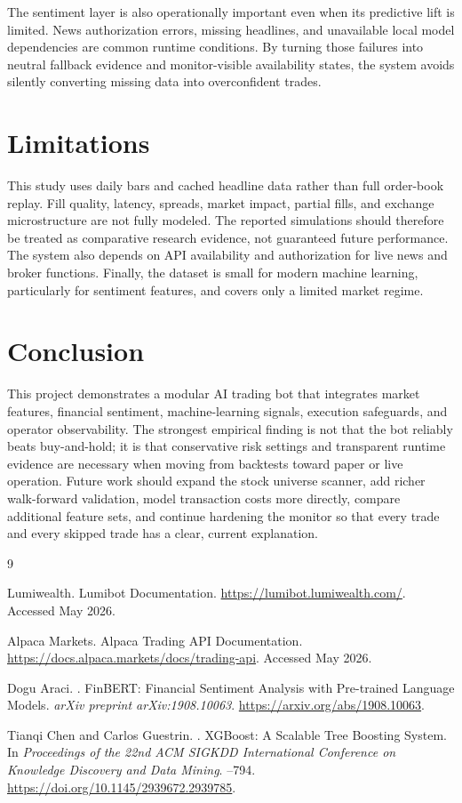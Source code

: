 \documentclass[sigconf,nonacm]{acmart}
\begin{document}
The sentiment layer is also operationally important even when its predictive lift is limited. News authorization errors, missing headlines, and unavailable local model dependencies are common runtime conditions. By turning those failures into neutral fallback evidence and monitor-visible availability states, the system avoids silently converting missing data into overconfident trades.

\section{Limitations}
This study uses daily bars and cached headline data rather than full order-book replay. Fill quality, latency, spreads, market impact, partial fills, and exchange microstructure are not fully modeled. The reported simulations should therefore be treated as comparative research evidence, not guaranteed future performance. The system also depends on API availability and authorization for live news and broker functions. Finally, the dataset is small for modern machine learning, particularly for sentiment features, and covers only a limited market regime.

\section{Conclusion}
This project demonstrates a modular AI trading bot that integrates market features, financial sentiment, machine-learning signals, execution safeguards, and operator observability. The strongest empirical finding is not that the bot reliably beats buy-and-hold; it is that conservative risk settings and transparent runtime evidence are necessary when moving from backtests toward paper or live operation. Future work should expand the stock universe scanner, add richer walk-forward validation, model transaction costs more directly, compare additional feature sets, and continue hardening the monitor so that every trade and every skipped trade has a clear, current explanation.

\begin{thebibliography}{9}

Lumiwealth.
\newblock Lumibot Documentation.
\newblock \url{https://lumibot.lumiwealth.com/}.
\newblock Accessed May 2026.

Alpaca Markets.
\newblock Alpaca Trading API Documentation.
\newblock \url{https://docs.alpaca.markets/docs/trading-api}.
\newblock Accessed May 2026.

Dogu Araci.
.
\newblock FinBERT: Financial Sentiment Analysis with Pre-trained Language Models.
\newblock \emph{arXiv preprint arXiv:1908.10063}.
\newblock \url{https://arxiv.org/abs/1908.10063}.

Tianqi Chen and Carlos Guestrin.
.
\newblock XGBoost: A Scalable Tree Boosting System.
\newblock In \emph{Proceedings of the 22nd ACM SIGKDD International Conference on Knowledge Discovery and Data Mining}.
--794.
\newblock \url{https://doi.org/10.1145/2939672.2939785}.

\end{thebibliography}
\end{document}
